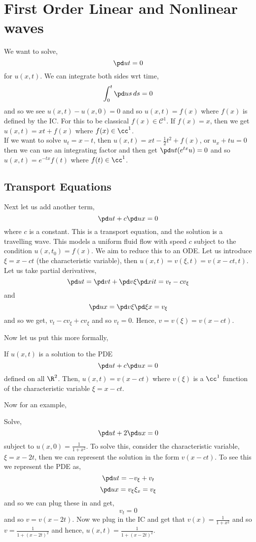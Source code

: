 \section{First Order Linear and Nonlinear waves}
We want to solve,
$$ \pd u t = 0 $$
for $u(x, t)$. We can integrate both sides wrt time,
$$ \int_0^t \pd u s \, ds = 0 $$
and so we see $u(x, t) - u(x, 0) = 0$ and so $u(x, t) = f(x)$ where $f(x)$ is defined by the IC. For this to be classical $f(x) \in \mathcal{C}^1$. If $f(x) = x$, then we get $u(x, t) = xt + f(x)$ where $f(x) \in \cc^1$.\\

\noindent
If we want to solve $u_t = x - t$, then $u(x, t) = xt - \frac{1}{2}t^2 + f(x)$, or $u_x + tu = 0$ then we can use an integrating factor and then get $\pd u t (e^{tx}u) = 0$ and so $u(x, t) = e^{-tx}f(t)$ where $f(t) \in \cc^1$.\\

\subsection{Transport Equations}

Next let us add another term,
$$\pd u t + c\pd u x = 0$$
where $c$ is a constant. This is a transport equation, and the solution is a travelling wave. This models a uniform fluid flow with speed $c$ subject to the condition $u(x, t_0) = f(x)$. We aim to reduce this to an ODE. Let us introduce $\xi = x - ct$ (the characteristic variable), then $u(x, t) = v(\xi, t) = v(x - ct, t)$. Let us take partial derivatives,
$$ \pd u t = \pd v t + \pd v \xi \pd xi t = v_t - cv_\xi$$
and
$$ \pd u x = \pd v \xi \pd \xi x = v_\xi $$
and so we get, $v_t - cv_\xi + cv_\xi$ and so $v_t = 0$. Hence, $v = v(\xi) = v(x - ct)$.

Now let us put this more formally,
\begin{nprop}
   If $u(x, t)$ is a solution to the PDE
   $$\pd u t + c\pd u x = 0$$
   defined on all $\R^2$. Then, $u(x, t) = v(x - ct)$ where $v(\xi)$ is a $\cc^1$ function of the characteristic variable $\xi = x - ct$.
\end{nprop}

Now for an example,
\begin{eg}
  Solve,
  $$ \pd u t + 2\pd u x = 0 $$
  subject to $u(x, 0) = \frac{1}{1 + x^2}$. To solve this, consider the characteristic variable, $\xi = x - 2t$, then we can represent the solution in the form $v(x - ct)$. To see this we represent the PDE as,
  $$ \pd u t = -v_\xi + v_t $$
  $$ \pd u x = v_\xi\xi_x = v_\xi $$
  and so we can plug these in and get,
  $$ v_t = 0 $$
  and so $v = v(x - 2t)$. Now we plug in the IC and get that $v(x) = \frac{1}{1 + x^2}$ and so $v = \frac{1}{1 + (x - 2t)^2}$ and hence, $u(x, t) = \frac{1}{1 + (x - 2t)^2}$.
\end{eg}

